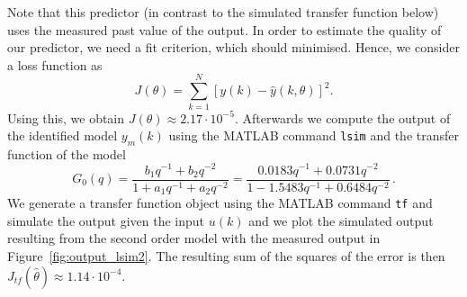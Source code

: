 Note that this predictor (in contrast to the simulated transfer function below) uses the measured past value of the output.
In order to estimate the quality of our predictor, we need a fit criterion, which should minimised. Hence, we consider a loss function as 
\begin{equation}\label{eq:J}
	J(\theta) = \sum\limits_{k=1}^N \left[y(k) - \hat{y}(k,\theta) \right]^2.
\end{equation}
Using this, we obtain $ J(\theta) \approx 2.17 \cdot 10^{-5}$. 
Afterwards we compute the output of the identified model $y_m(k)$ using the MATLAB command \texttt{lsim} and the transfer function of the model
\begin{equation}
	G_0(q) = \frac{b_1 q^{-1} + b_2 q^{-2}}{1 + a_1 q^{-1} + a_2 q^{-2}}
	= \frac{0.0183q^{-1} + 0.0731q^{-2}}{1 - 1.5483q^{-1} + 0.6484q^{-2}}\, .
\end{equation}
We generate a transfer function object using the MATLAB command \texttt{tf} and simulate the output given the input $u(k)$ and we plot the simulated output resulting from the second order model with the measured output in Figure~\ref{fig:output_lsim2}.
The resulting sum of the squares of the error is then $ J_{tf}(\hat{\theta}) \approx 1.14 \cdot 10^{-4}$. 
